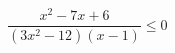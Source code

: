 \begin{ex}[type=inequality]
	\begin{condition}
		\( \dfrac{x^2-7x+6}{(3x^2-12)(x-1)}\le0 \)
	\end{condition}
	\answer{\( (-\infty;-2)\cup(-2;6] \)}
\end{ex}